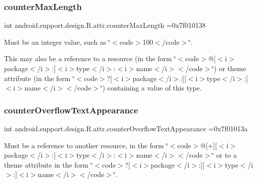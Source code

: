 \subsubsection{\texorpdfstring{counter\+Max\+Length}{counterMaxLength}}
{\footnotesize\ttfamily int android.\+support.\+design.\+R.\+attr.\+counter\+Max\+Length =0x7f010138\hspace{0.3cm}{\ttfamily [static]}}

Must be an integer value, such as \char`\"{}$<$code$>$100$<$/code$>$\char`\"{}. 

This may also be a reference to a resource (in the form \char`\"{}$<$code$>$@\mbox{[}$<$i$>$package$<$/i$>$\+:\mbox{]}$<$i$>$type$<$/i$>$\+:$<$i$>$name$<$/i$>$$<$/code$>$\char`\"{}) or theme attribute (in the form \char`\"{}$<$code$>$?\mbox{[}$<$i$>$package$<$/i$>$\+:\mbox{]}\mbox{[}$<$i$>$type$<$/i$>$\+:\mbox{]}$<$i$>$name$<$/i$>$$<$/code$>$\char`\"{}) containing a value of this type. \mbox{\label{classandroid_1_1support_1_1design_1_1R_1_1attr_afd340be60d52f269d6b3ea3f260cef5d}} 
\subsubsection{\texorpdfstring{counter\+Overflow\+Text\+Appearance}{counterOverflowTextAppearance}}
{\footnotesize\ttfamily int android.\+support.\+design.\+R.\+attr.\+counter\+Overflow\+Text\+Appearance =0x7f01013a\hspace{0.3cm}{\ttfamily [static]}}

Must be a reference to another resource, in the form \char`\"{}$<$code$>$@\mbox{[}+\mbox{]}\mbox{[}$<$i$>$package$<$/i$>$\+:\mbox{]}$<$i$>$type$<$/i$>$\+:$<$i$>$name$<$/i$>$$<$/code$>$\char`\"{} or to a theme attribute in the form \char`\"{}$<$code$>$?\mbox{[}$<$i$>$package$<$/i$>$\+:\mbox{]}\mbox{[}$<$i$>$type$<$/i$>$\+:\mbox{]}$<$i$>$name$<$/i$>$$<$/code$>$\char`\"{}. \mbox{\label{classandroid_1_1support_1_1design_1_1R_1_1attr_a5d6d057b4e0916f2956a030fc7245a8e}} 
